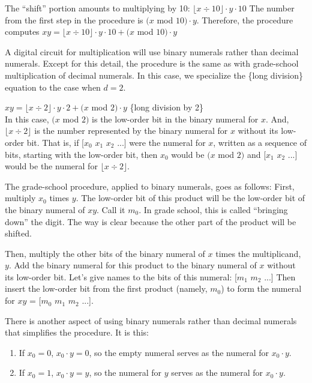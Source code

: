 The ``shift'' portion amounts to multiplying by 10: $\lfloor x \div 10 \rfloor \cdot y \cdot 10$
The number from the first step in the procedure is $(x$ mod $10) \cdot y$.
Therefore, the procedure computes
$xy = \lfloor x \div 10 \rfloor \cdot y \cdot 10 + (x$ mod $10) \cdot y$

A digital circuit for multiplication
will use binary numerals rather than decimal numerals.
Except for this detail, the procedure is the same
as with grade-school multiplication of decimal numerals.
In this case, we specialize the \{long division\} equation to the case when $d = 2$.

\hspace{2cm} $xy = \lfloor x \div 2 \rfloor \cdot y \cdot 2 + (x$ mod $2) \cdot y$
\hfill \{long division by 2\} \\

In this case, $(x$ mod $2)$ is the low-order bit in the binary numeral for $x$.
And, $\lfloor x \div 2 \rfloor$ is the number represented by the binary numeral for $x$
without its low-order bit.
That is, if [$x_0$ $x_1$ $x_2$ ...] were the numeral for $x$,
written as a sequence of bits, starting with the low-order bit,
then $x_0$ would be $(x$ mod $2)$ and [$x_1$ $x_2$ ...] would be the numeral for
$\lfloor x \div 2 \rfloor$.

The grade-school procedure, applied to binary numerals, goes as follows:
First, multiply $x_0$ times $y$. The low-order bit of this product will be the low-order bit
of the binary numeral of $xy$. Call it $m_0$. In grade school, this is called ``bringing
down'' the digit. The way is clear because the other part of the product will be shifted.

Then, multiply the other bits of the binary numeral of $x$ times the multiplicand, $y$.
Add the binary numeral for this product to the binary numeral of $x$ without its
low-order bit. Let's give names to the bits of this numeral: [$m_1$ $m_2$ ...]
Then insert the low-order bit from the first product (namely, $m_0$) to form
the numeral for $xy$ = [$m_0$ $m_1$ $m_2$ ...].

There is another aspect of using binary numerals rather than decimal numerals
that simplifies the procedure. It is this:
\begin{enumerate}
  \item If $x_0 = 0$, $x_0 \cdot y = 0$,
        so the empty numeral serves as the numeral for $x_0 \cdot y$.
  \item If $x_0 = 1$,
        $x_0 \cdot y = y$, so the numeral for $y$ serves
        as the numeral for $x_0 \cdot y$.
\end{enumerate}

